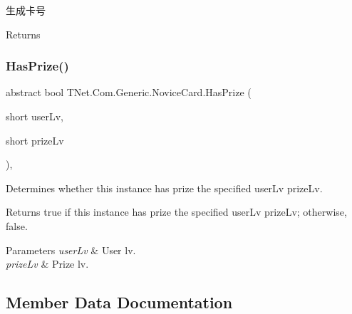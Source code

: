 生成卡号 

\begin{DoxyReturn}{Returns}

\end{DoxyReturn}
\mbox{\label{class_t_net_1_1_com_1_1_generic_1_1_novice_card_a4b8f5febe9ada8709a3c7d86320f2147}} 
\subsubsection{\texorpdfstring{Has\+Prize()}{HasPrize()}}
{\footnotesize\ttfamily abstract bool T\+Net.\+Com.\+Generic.\+Novice\+Card.\+Has\+Prize (\begin{DoxyParamCaption}\item[{short}]{user\+Lv,  }\item[{short}]{prize\+Lv }\end{DoxyParamCaption})\hspace{0.3cm}{\ttfamily [protected]}, {}}



Determines whether this instance has prize the specified user\+Lv prize\+Lv. 

\begin{DoxyReturn}{Returns}
{\ttfamily true} if this instance has prize the specified user\+Lv prize\+Lv; otherwise, {\ttfamily false}.
\end{DoxyReturn}

\begin{DoxyParams}{Parameters}
{\em user\+Lv} & User lv.\\
\hline
{\em prize\+Lv} & Prize lv.\\
\hline
\end{DoxyParams}


\subsection{Member Data Documentation}
\mbox{\label{class_t_net_1_1_com_1_1_generic_1_1_novice_card_aae34a6dd1483bfde59e5e1b81de377d8}} 
